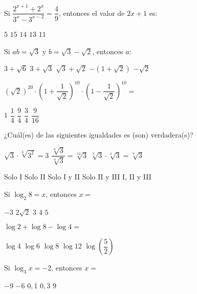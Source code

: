 \documentclass[]{srs}
\begin{document}
\begin{preguntas}
\pregunta Si $\dfrac{2^{x+1} + 2^x}{3^x - 3^{x-2}} = \dfrac{4}{9}$, entonces el valor de $2x + 1$ es:
\begin{vertical}
\alternativa $5$
\alternativa $15$
\alternativa $14$
\alternativa $13$
\alternativa $11$
\end{vertical}

\pregunta Si $ab = \sqrt{3}$ y $b = \sqrt{3} - \sqrt{2}$, entonces $a:$
\begin{vertical}
\alternativa $3 + \sqrt{6}$
\alternativa $3 + \sqrt{3}$
\alternativa $\sqrt{3} + \sqrt{2}$
\alternativa $-\left(1 + \sqrt{2}\right)$
\alternativa $-\sqrt{2}$
\end{vertical}

\pregunta $\left(\sqrt{2}\right)^{20} \cdot \left(1 + \dfrac{1}{\sqrt{2}}\right)^{10} \cdot \left(1 - \dfrac{1}{\sqrt{2}}\right)^{10} =$
\begin{vertical}
\alternativa $1$
\alternativa $\dfrac{1}{4}$
\alternativa $\dfrac{9}{4}$
\alternativa $\dfrac{3}{4}$
\alternativa $\dfrac{9}{16}$
\end{vertical}


\pregunta ¿Cuál(es) de las siguientes igualdades es (son) verdadera(s)?
\begin{verticali}
\alternativa $\sqrt{3} \cdot \sqrt[3]{3^2} = 3$
\alternativa $\dfrac{\sqrt[3]{3}}{\sqrt[4]{3}} = \sqrt[12]{3}$
\alternativa $\sqrt[3]{3} \cdot \sqrt[4]{3} = \sqrt[7]{3}$
\end{verticali}
\begin{vertical}
\alternativa Solo I
\alternativa Solo II
\alternativa Solo I y II
\alternativa Solo II y III
\alternativa I, II y III
\end{vertical}

\pregunta Si $\log_2 8 = x$, entonces $x =$
\begin{vertical}
\alternativa $-3$
\alternativa $2\sqrt{2}$
\alternativa $3$
\alternativa $4$
\alternativa $5$
\end{vertical}

\pregunta $\log 2 + \log 8 - \log 4 =$
\begin{vertical}
\alternativa $\log 4$
\alternativa $\log 6$
\alternativa $\log 8$
\alternativa $\log 12$
\alternativa $\log \left(\dfrac{5}{2}\right)$
\end{vertical}

\pregunta Si $\log_3 x = -2$, entonces $x =$
\begin{vertical}
\alternativa $-9$
\alternativa $-6$
\alternativa $0,\overline{1}$
\alternativa $0,\overline{3}$
\alternativa $9$
\end{vertical}


\end{preguntas}
\end{document}
